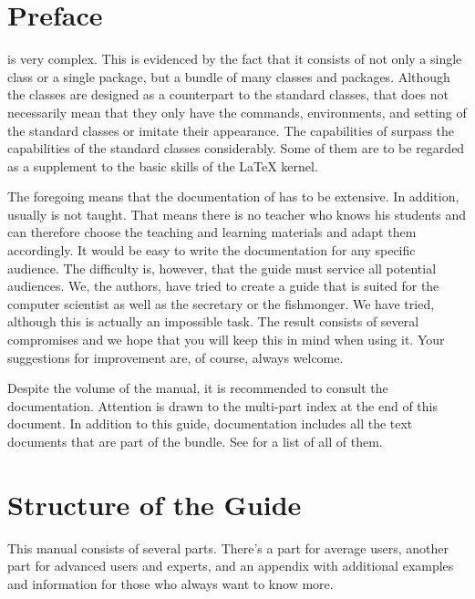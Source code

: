 \section{Preface}\label{sec:introduction.preface}

\KOMAScript{} is very complex. This is evidenced by the fact that it
consists of
not only a single class or a single package, but a bundle of many classes and
packages. Although the classes are designed as a counterpart to the standard
classes, that does not necessarily mean that they only have the commands,
environments, and setting of the standard classes or imitate their
appearance. The capabilities of \KOMAScript{} surpass the capabilities of the
standard classes considerably. Some of them are to be regarded as a supplement
to the basic skills of the \LaTeX{} kernel.

The foregoing means that the documentation of \KOMAScript{} has to be
extensive. In addition, \KOMAScript{} usually is not taught. That means there
is no teacher who knows his students and can therefore choose the teaching and
learning materials and adapt them accordingly. It would be easy to write the
documentation for any specific audience. The difficulty is, however, that the
guide must service all potential audiences. We, the authors, have tried to
create a guide that is suited for the computer scientist as well as the
secretary or the fishmonger. We have tried, although this is actually %
an impossible task. The result consists of several compromises and we
hope that you will keep this in mind when using it.  Your suggestions for
improvement are, of course, always welcome.

Despite the volume of the manual, %
it is recommended to
consult the documentation. Attention is drawn to the multi-part index at the
end of this document. In addition to this guide, documentation includes all the
text documents that are part of the bundle. See  for a list
of all of them.


\section{Structure of the Guide}\label{sec:introduction.structure}

This manual consists of several parts. There's a part for average users,
another part for advanced users and experts, and an appendix with additional
examples and information for those who always want to know more.


